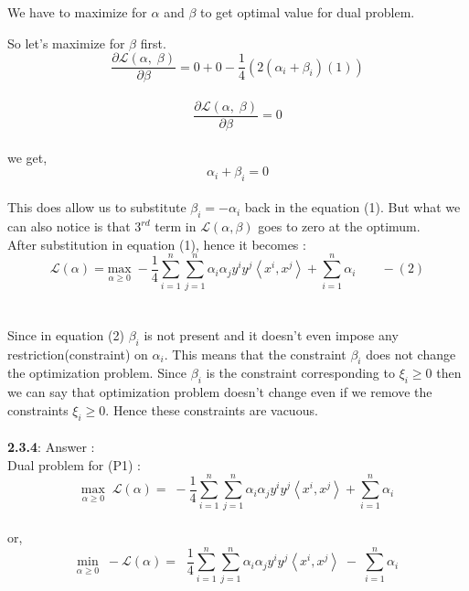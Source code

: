\documentclass[a4paper,11pt]{article}
\begin{document}
\begin{mlsolution}
We have to maximize for $\alpha$ and $\beta$ to get optimal value for dual problem.

So let's maximize for $\beta$ first.\\

\[
\frac{\partial \mathcal{L}\left ( \alpha,\; \beta  \right ) }{\partial \beta} = 0 + 0 -\frac{1}{4}\left ( 2(\alpha_{i} + \beta_{i})(1) \right ) \] \\

\; \[\frac{\partial \mathcal{L}\left ( \alpha,\; \beta  \right ) }{\partial \beta} = 0
\]\\
we get,
\[
\alpha_{i} + \beta_{i} = 0
\]\\

This does allow us to substitute $\beta_{i} = - \alpha_{i}$ back in the equation (1). But what we can also notice is that $3^{rd}$ term in $\mathcal{L}(\alpha, \beta)$ goes to zero at the optimum.\\

After substitution in equation (1), hence it becomes :\\

\[
  \mathcal{L}\left ( \alpha \right ) = \underset{\alpha\geq 0}{\text{max}} \; -\frac{1}{4}\sum_{i=1}^{n}\sum_{j=1}^{n}\alpha_{i}\alpha_{j}y^{i}y^{j}\left \langle x^{i}, x^{j} \right \rangle+ \sum_{i=1}^{n}\alpha_{i} \;\;\;\;\;\;\; - (2)
\]\\\\Since in equation (2) $\beta_{i}$ is not present and it doesn't even impose any restriction(constraint) on $\alpha_{i}$. This means that the constraint $\beta_{i}$ does not change the optimization problem. Since $\beta_{i}$ is the constraint corresponding to $\xi_{i} \geq 0$ then we can say that optimization problem doesn't change even if we remove the constraints $\xi_{i} \geq 0$. Hence these constraints are vacuous.\\\\
\newpage
\textbf{2.3.4}: Answer :\\

Dual problem for (P1) :
\[
\underset{\alpha\geq 0}{\text{max}} \;\; \mathcal{L}\left ( \alpha \right ) =  \; -\frac{1}{4}\sum_{i=1}^{n}\sum_{j=1}^{n}\alpha_{i}\alpha_{j}y^{i}y^{j}\left \langle x^{i}, x^{j} \right \rangle+ \sum_{i=1}^{n}\alpha_{i}
\]\\
or,\\
\[
\underset{\alpha\geq 0}{\text{min}} \;\; - \mathcal{L}\left ( \alpha \right ) = \; \;\frac{1}{4}\sum_{i=1}^{n}\sum_{j=1}^{n}\alpha_{i}\alpha_{j}y^{i}y^{j}\left \langle x^{i}, x^{j} \right \rangle \;-\; \sum_{i=1}^{n}\alpha_{i}
\]\\


\end{mlsolution}
\end{document}
